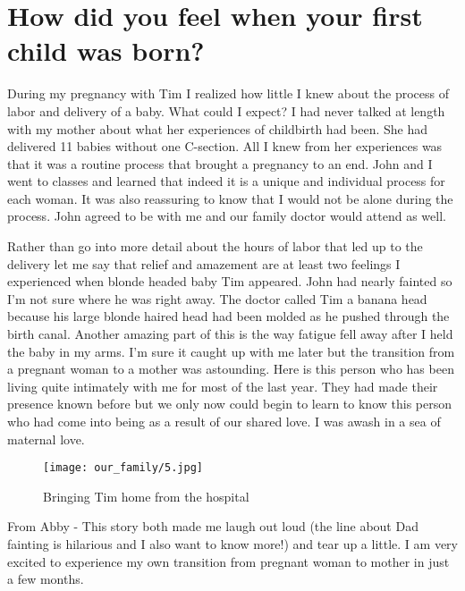 \section{How did you feel when your first child was born?}
During my pregnancy with Tim I realized how little I knew about the process of labor and delivery of a baby.
What could I expect? I had never talked at length with my mother about what her experiences of childbirth had been.
She had delivered 11 babies without one C-section.
All I knew from her experiences was that it was a routine process that brought a pregnancy to an end.
John and I went to classes and learned that indeed it is a unique and individual process for each woman.
It was also reassuring to know that I would not be alone during the process.
John agreed to be with me and our family doctor would attend as well.

Rather than go into more detail about the hours of labor that led up to the delivery let me say that relief and amazement are at least two feelings I experienced when blonde headed baby Tim appeared.
John had nearly fainted so I'm not sure where he was right away.
The doctor called Tim a banana head because his large blonde haired head had been molded as he pushed through the birth canal.
Another amazing part of this is the way fatigue fell away after I held the baby in my arms.
I'm sure it caught up with me later but the transition from a pregnant woman to a mother was astounding.
Here is this person who has been living quite intimately with me for most of the last year.
They had made their presence known before but we only now could begin to learn to know this person who had come into being as a result of our shared love.
I was awash in a sea of maternal love.
\begin{figure}
\centering
\texttt{[image: our\_family/5.jpg]}
\caption{
Bringing Tim home from the hospital
}
\end{figure}

From Abby - This story both made me laugh out loud (the line about Dad fainting is hilarious and I also want to know more!) and tear up a little.
I am very excited to experience my own transition from pregnant woman to mother in just a few months.





